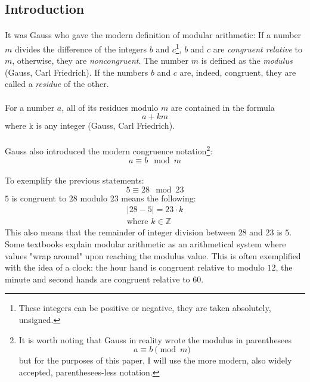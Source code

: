 \documentclass[a4paper, 12pt]{article}
\begin{document}
\subsection{Introduction}
\paragraph*{}
It was Gauss who gave the modern definition of modular arithmetic: If a number $m$ divides the difference of the 
integers $b$ and $c$\footnote{These integers can be positive or negative, they are taken absolutely, unsigned.}, 
$b$ and $c$ are \textit{congruent relative} to $m$, otherwise, they are \textit{noncongruent}. The number $m$ is 
defined as the \textit{modulus} (Gauss, Carl Friedrich). If the numbers $b$ and $c$ are, indeed, congruent, they are 
called a \textit{residue} of the other.

\paragraph*{}
For a number $a$, all of its residues modulo $m$ are contained in the formula
$$a + km$$
where k is any integer (Gauss, Carl Friedrich).

\paragraph*{}
Gauss also introduced the modern congruence notation\footnote{It is worth noting that Gauss in reality wrote the 
modulus in parenthesees $$a \equiv b \pmod{m}$$ but for the purposes of this paper, I will use the more modern, also 
widely accepted, parenthesees-less notation.}:
$$a \equiv b \mod m$$

\paragraph*{}
To exemplify the previous statements:
$$5 \equiv 28 \mod 23$$
$5$ is congruent to $28$ modulo $23$ means the following:
\begin{gather*}
  \lvert 28 - 5 \rvert = 23 \cdot k\\
  \text{where } k \in \mathbb{Z}
\end{gather*}
This also means that the remainder of integer division between $28$ and $23$ is $5$. Some textbooks explain modular 
arithmetic as an arithmetical system where values "wrap around" upon reaching the modulus value. This is often 
exemplified with the idea of a clock: the hour hand is congruent relative to modulo $12$, the minute and second hands 
are congruent relative to $60$.
\end{document}
